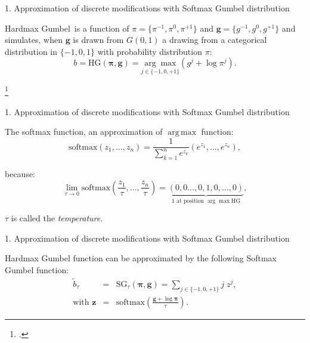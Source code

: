 \documentclass[10pt,aspectratio=169]{beamer}
\renewcommand{\vec}[1]{\mathbf{#1}}
\DeclareMathOperator*{\argmax}{arg\,max}
\begin{document}
\begin{frame}{1. Approximation of discrete modifications with Softmax Gumbel distribution}

    \begin{tcolorbox}[colback=lightgreen,colframe=greentheme,title=\textbf{Definition} (Hardmax Gumbel Function)]
        Hardmax Gumbel\footnotemark~is a function of  $\pi = \{\pi^{-1},\pi^{0}, \pi^{+1}\}$ and $\vec{g} = \{g^{-1},g^{0}, g^{+1}\}$ and simulates, when $\vec{g}$ is drawn from $G(0,1)$ a drawing from a categorical distribution in $\{-1,0,1\}$ with probability distribution $\pi$:  
        \begin{equation}
            b = \mbox{HG}(\bm{\pi}, \vec{g}) = \underset{{j \in \{-1,0,+1\}}}{\arg \max} (g^j+ \log \pi^j).
        \end{equation}
    \end{tcolorbox}

    \footcitetext{jang2016categorical}

\end{frame}

\begin{frame}{1. Approximation of discrete modifications with Softmax Gumbel distribution}
    
    The softmax function, an approximation of $\argmax$ function:
    \begin{equation}
        \mbox{softmax}\left(z_1,\ldots,z_n\right) = \frac{1}{\sum_{k=1}^n e^{z_k}}(e^{z_1},\ldots,e^{z_n}),
    \end{equation}

    because: 
    \begin{equation}
        \lim_{\tau \rightarrow 0} \mbox{softmax}\left(\frac{z_1}{\tau},\ldots,\frac{z_n}{\tau}\right) = \underbrace{(0,0\ldots,0,1,0,\dots, 0)}_{1 \text{ at position } \arg \max \text{HG}}, 
    \end{equation}

    $\tau$ is called the \emph{temperature}.

\end{frame}

\begin{frame}{1. Approximation of discrete modifications with Softmax Gumbel distribution}
    
    \begin{tcolorbox}[colback=lightgreen,colframe=greentheme,title=\textbf{Definition} (Softmax Gumbel Function)]

        Hardmax Gumbel function can be approximated by the following Softmax Gumbel function: 
        \begin{eqnarray}\label{eq:softmaxgumbel} 
            \tilde{b}_{\tau} &=& \mbox{SG}_\tau(\bm{\pi}, \vec{g}) = \sum_{j \in \{-1,0,+1\}} j\;z^j,\\
            \text{with } \vec{z} &=& \mbox{softmax}\left(\frac{\vec{g}+\log \bm{\pi}}{\tau}\right).
        \end{eqnarray}

    \end{tcolorbox}

\end{frame}
\end{document}

